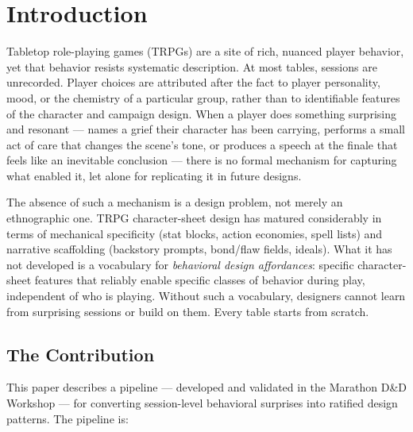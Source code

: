 
\section{Introduction}
\label{sec:introduction}

Tabletop role-playing games (TRPGs) are a site of rich, nuanced player behavior, yet
that behavior resists systematic description. At most tables, sessions are unrecorded.
Player choices are attributed after the fact to player personality, mood, or the
chemistry of a particular group, rather than to identifiable features of the character
and campaign design. When a player does something surprising and resonant --- names a
grief their character has been carrying, performs a small act of care that changes the
scene's tone, or produces a speech at the finale that feels like an inevitable
conclusion --- there is no formal mechanism for capturing what enabled it, let alone
for replicating it in future designs.

The absence of such a mechanism is a design problem, not merely an ethnographic one.
TRPG character-sheet design has matured considerably in terms of mechanical specificity
(stat blocks, action economies, spell lists) and narrative scaffolding (backstory
prompts, bond/flaw fields, ideals). What it has not developed is a vocabulary for
\textit{behavioral design affordances}: specific character-sheet features that reliably
enable specific classes of behavior during play, independent of who is playing. Without
such a vocabulary, designers cannot learn from surprising sessions or build on them.
Every table starts from scratch.

\subsection{The Contribution}

This paper describes a pipeline --- developed and validated in the Marathon D\&D
Workshop --- for converting session-level behavioral surprises into ratified design
patterns. The pipeline is:

